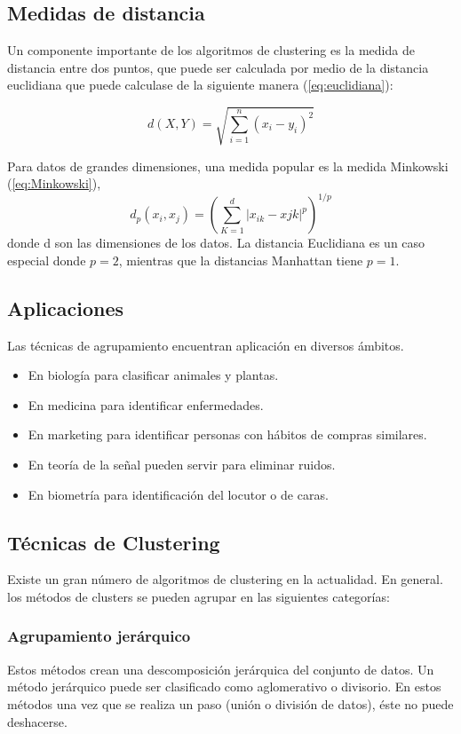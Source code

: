 \documentclass[
]{article}
\begin{document}
\subsection{Medidas de distancia}
Un componente importante de los algoritmos de clustering es la medida de distancia entre dos puntos, que puede ser calculada por medio de la distancia euclidiana que puede calculase de la siguiente manera (\ref{eq:euclidiana}):

\begin{equation}\label{eq:euclidiana}
d(X,Y) = \sqrt{\sum_{i=1}^n(x_i - y_i)^2}
\end{equation}

Para datos de grandes dimensiones, una medida popular es la medida Minkowski (\ref{eq:Minkowski}),
\begin{equation}\label{eq:Minkowski}
d_p(x_i,x_j) = \left(\sum_{K=1}^d|x_{ik} - x{jk}|^p\right)^{1/p}
\end{equation}
donde d son las dimensiones de los datos. La distancia Euclidiana es un caso especial donde $p=2$, mientras que la distancias Manhattan tiene $p=1$.

\subsection{Aplicaciones}
Las técnicas de agrupamiento encuentran aplicación en diversos ámbitos.
\begin{itemize}
	\item En biología para clasificar animales y plantas.
	\item En medicina para identificar enfermedades.
	\item En marketing para identificar personas con hábitos de compras similares.
	\item En teoría de la señal pueden servir para eliminar ruidos.
	\item En biometría para identificación del locutor o de caras.
\end{itemize}

\subsection{Técnicas de Clustering}
Existe un gran número de algoritmos de clustering en la actualidad. En general. los métodos de clusters se pueden agrupar en las siguientes categorías:

\subsubsection{Agrupamiento jerárquico}
Estos métodos crean una descomposición jerárquica del conjunto de datos. Un método jerárquico puede ser clasificado como aglomerativo o divisorio. En estos métodos una vez que se realiza un paso (unión o división de datos), éste no puede deshacerse.
\end{document}
